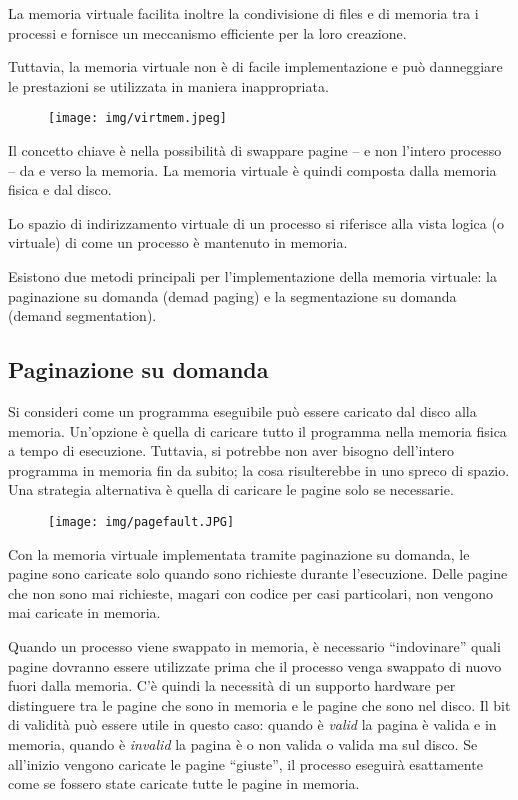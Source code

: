 \documentclass[a4]{article}
\begin{document}
La memoria virtuale facilita inoltre la condivisione di files e di memoria tra i processi e fornisce un meccanismo efficiente per la loro creazione.

Tuttavia, la memoria virtuale non è di facile implementazione e può danneggiare le prestazioni se utilizzata in maniera inappropriata.

\begin{figure}[h!]
    \centering    
    \texttt{[image: img/virtmem.jpeg]}
\end{figure}

Il concetto chiave è nella possibilità di swappare pagine -- e non l'intero processo -- da e verso la memoria. La memoria virtuale è quindi composta dalla memoria fisica e dal disco.

Lo spazio di indirizzamento virtuale di un processo si riferisce alla vista logica (o virtuale) di come un processo è mantenuto in memoria.

Esistono due metodi principali per l'implementazione della memoria virtuale: la paginazione su domanda (demad paging) e la segmentazione su domanda (demand segmentation).

\subsection{Paginazione su domanda}
Si consideri come un programma eseguibile può essere caricato dal disco alla memoria. Un'opzione è quella di caricare tutto il programma nella memoria fisica a tempo di esecuzione. Tuttavia, si potrebbe non aver bisogno dell'intero programma in memoria fin da subito; la cosa risulterebbe in uno spreco di spazio. Una strategia alternativa è quella di caricare le pagine solo se necessarie.

\begin{figure}[h!]
    \centering    
    \texttt{[image: img/pagefault.JPG]}
\end{figure}

Con la memoria virtuale implementata tramite paginazione su domanda, le pagine sono caricate solo quando sono richieste durante l'esecuzione. Delle pagine che non sono mai richieste, magari con codice per casi particolari, non vengono mai caricate in memoria.

Quando un processo viene swappato in memoria, è necessario ``indovinare'' quali pagine dovranno essere utilizzate prima che il processo venga swappato di nuovo fuori dalla memoria. C'è quindi la necessità di un supporto hardware per distinguere tra le pagine che sono in memoria e le pagine che sono nel disco. Il bit di validità può essere utile in questo caso: quando è \textit{valid} la pagina è valida e in memoria, quando è \textit{invalid} la pagina è o non valida o valida ma sul disco. Se all'inizio vengono caricate le pagine ``giuste'', il processo eseguirà esattamente come se fossero state caricate tutte le pagine in memoria.
\end{document}

